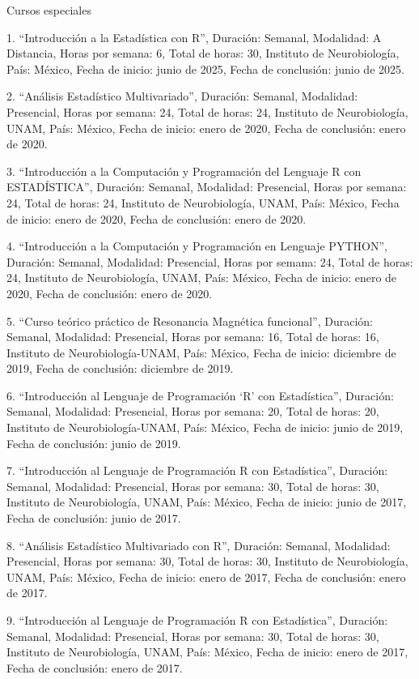 Cursos especiales

1. “Introducción a la Estadística con R”, Duración: Semanal, Modalidad: A Distancia, Horas por 
semana: 6, Total de horas: 30, Instituto de Neurobiología, País: México, Fecha de inicio: junio de 
2025, Fecha de conclusión: junio de 2025.

2. “Análisis Estadístico Multivariado”, Duración: Semanal, Modalidad: Presencial, Horas por semana: 
24, Total de horas: 24, Instituto de Neurobiología, UNAM, País: México, Fecha de inicio: enero de 
2020, Fecha de conclusión: enero de 2020.

3. “Introducción a la Computación y Programación del Lenguaje R con ESTADÍSTICA”, Duración: Semanal, 
Modalidad: Presencial, Horas por semana: 24, Total de horas: 24, Instituto de Neurobiología, UNAM, 
País: México, Fecha de inicio: enero de 2020, Fecha de conclusión: enero de 2020.

4. “Introducción a la Computación y Programación en Lenguaje PYTHON”, Duración: Semanal, Modalidad: 
Presencial, Horas por semana: 24, Total de horas: 24, Instituto de Neurobiología, UNAM, País: 
México, Fecha de inicio: enero de 2020, Fecha de conclusión: enero de 2020.

5. “Curso teórico práctico de Resonancia Magnética funcional”, Duración: Semanal, Modalidad: 
Presencial, Horas por semana: 16, Total de horas: 16, Instituto de Neurobiología-UNAM, País: México, 
Fecha de inicio: diciembre de 2019, Fecha de conclusión: diciembre de 2019.

6. “Introducción al Lenguaje de Programación ‘R’ con Estadística”, Duración: Semanal, Modalidad: 
Presencial, Horas por semana: 20, Total de horas: 20, Instituto de Neurobiología-UNAM, País: México, 
Fecha de inicio: junio de 2019, Fecha de conclusión: junio de 2019.

7. “Introducción al Lenguaje de Programación R con Estadística”, Duración: Semanal, Modalidad: 
Presencial, Horas por semana: 30, Total de horas: 30, Instituto de Neurobiología, UNAM, País: 
México, Fecha de inicio: junio de 2017, Fecha de conclusión: junio de 2017.

8. “Análisis Estadístico Multivariado con R”, Duración: Semanal, Modalidad: Presencial, Horas por 
semana: 30, Total de horas: 30, Instituto de Neurobiología, UNAM, País: México, Fecha de inicio: 
enero de 2017, Fecha de conclusión: enero de 2017.

9. “Introducción al Lenguaje de Programación R con Estadística”, Duración: Semanal, Modalidad: 
Presencial, Horas por semana: 30, Total de horas: 30, Instituto de Neurobiología, UNAM, País: 
México, Fecha de inicio: enero de 2017, Fecha de conclusión: enero de 2017.

